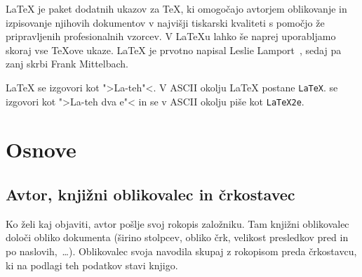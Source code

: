 \LaTeX{} je paket dodatnih ukazov za \TeX{}, ki omogočajo avtorjem oblikovanje in
izpisovanje njihovih dokumentov v najvišji tiskarski kvaliteti s pomočjo
že pripravljenih profesionalnih vzorcev. V \LaTeX{}u lahko
še naprej uporabljamo skoraj vse \TeX{}ove ukaze. \LaTeX{} je prvotno napisal 
Leslie Lamport~\cite{manual}, sedaj pa zanj 
skrbi
Frank Mittelbach.


\LaTeX{} se izgovori kot ">La-teh"<.  V ASCII okolju 
\LaTeX{} postane \texttt{LaTeX}. \LaTeXe{} se izgovori kot 
">La-teh dva e"< in se v ASCII okolju piše kot \texttt{LaTeX2e}.


%

\section{Osnove}
 
\subsection{Avtor, knjižni oblikovalec in črkostavec}

Ko želi kaj objaviti, avtor pošlje svoj rokopis založniku.
Tam knjižni oblikovalec določi obliko dokumenta (širino stolpcev, 
obliko črk, 
velikost presledkov pred in po naslovih,~\ldots). Oblikovalec svoja 
navodila skupaj z rokopisom
preda črkostavcu, ki na podlagi teh podatkov stavi knjigo.


